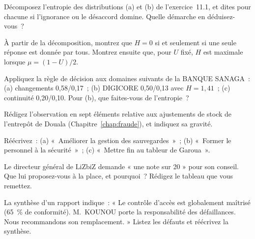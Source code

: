 \begin{boxexo}[title={\ding{45}\quad Exercice~11.2. Décomposer \niveaumoyen}]
Décomposez l'entropie des distributions (a) et (b) de l'exercice~11.1, et
dites pour chacune si l'ignorance ou le désaccord domine. Quelle démarche
en déduisez-vous~?
\end{boxexo}

\begin{boxexo}[title={\ding{45}\quad Exercice~11.3. Démontrer un cas limite \niveaumoyen}]
À partir de la décomposition, montrez que $H = 0$ si et seulement si une
seule réponse est donnée par tous. Montrez ensuite que, pour $U$ fixé, $H$
est maximale lorsque $\mu = (1-U)/2$.
\end{boxexo}

\begin{boxexo}[title={\ding{45}\quad Exercice~11.4. Appliquer la règle \niveaumoyen}]
Appliquez la règle de décision aux domaines suivants de la BANQUE SANAGA~:
(a) changements 0,58/0,17~; (b) DIGICORE 0,50/0,13 avec $H = 1{,}41$~;
(c) continuité 0,20/0,10. Pour (b), que faites-vous de l'entropie~?
\end{boxexo}

\begin{boxexo}[title={\ding{45}\quad Exercice~11.5. Rédiger une observation \niveaumoyen}]
Rédigez l'observation en sept éléments relative aux ajustements de stock
de l'entrepôt de Douala (Chapitre~\ref{chap:fraude}), et indiquez sa
gravité.
\end{boxexo}

\begin{boxexo}[title={\ding{45}\quad Exercice~11.6. Corriger des recommandations \niveaumoyen}]
Réécrivez~: (a) «~Améliorer la gestion des sauvegardes~»~; (b) «~Former le
personnel à la sécurité~»~; (c) «~Mettre fin au tableur de Garoua~».
\end{boxexo}

\begin{boxexo}[title={\ding{45}\quad Exercice~11.7. Une note globale \niveaumoyen}]
Le directeur général de LiZbiZ demande « une note sur 20 » pour son conseil.
Que lui proposez-vous à la place, et pourquoi~? Rédigez le tableau que vous
remettez.
\end{boxexo}

\begin{boxexo}[title={\ding{45}\quad Exercice~11.8. Relire un rapport \niveaumoyen}]
La synthèse d'un rapport indique~: « Le contrôle d'accès est globalement
maîtrisé (65~\% de conformité). M.~KOUNOU porte la responsabilité des
défaillances. Nous recommandons son remplacement. » Listez les défauts et
réécrivez la synthèse.
\end{boxexo}

